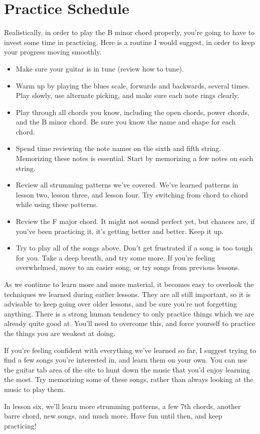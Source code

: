 \section{Practice Schedule}
Realistically, in order to play the B minor chord properly, you're going to have to invest some time in practicing. Here is a routine I would suggest, in order to keep your progress moving smoothly.
\begin{itemize}
\item Make sure your guitar is in tune (review how to tune).
\item Warm up by playing the blues scale, forwards and backwards, several times. Play slowly, use alternate picking, and make sure each note rings clearly.
\item Play through all chords you know, including the open chords, power chords, and the B minor chord. Be sure you know the name and shape for each chord.
\item Spend time reviewing the note names on the sixth and fifth string. Memorizing these notes is essential. Start by memorizing a few notes on each string.
\item Review all strumming patterns we've covered. We've learned patterns in lesson two, lesson three, and lesson four. Try switching from chord to chord while using these patterns.
\item Review the F major chord. It might not sound perfect yet, but chances are, if you've been practicing it, it's getting better and better. Keep it up.
\item Try to play all of the songs above. Don't get frustrated if a song is too tough for you. Take a deep breath, and try some more. If you're feeling overwhelmed, move to an easier song, or try songs from previous lessons. 
\end{itemize}
As we continue to learn more and more material, it becomes easy to overlook the techniques we learned during earlier lessons. They are all still important, so it is advisable to keep going over older lessons, and be sure you're not forgetting anything. There is a strong human tendency to only practice things which we are already quite good at. You'll need to overcome this, and force yourself to practice the things you are weakest at doing.

If you're feeling confident with everything we've learned so far, I suggest trying to find a few songs you're interested in, and learn them on your own. You can use the guitar tab area of the site to hunt down the music that you'd enjoy learning the most. Try memorizing some of these songs, rather than always looking at the music to play them.

In lesson six, we'll learn more strumming patterns, a few 7th chords, another barre chord, new songs, and much more. Have fun until then, and keep practicing! 

